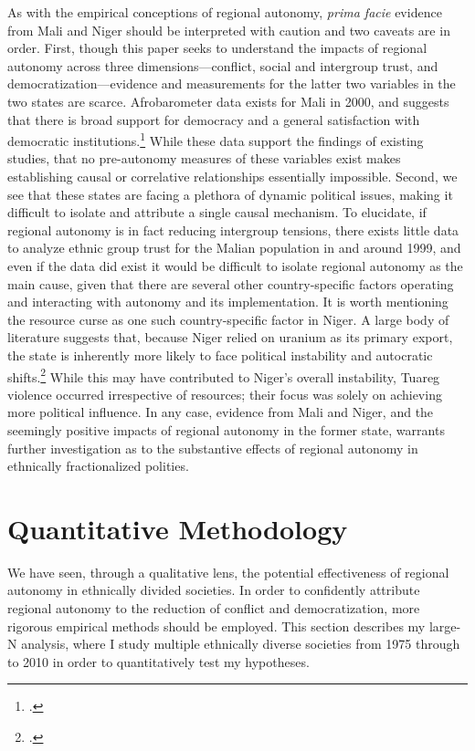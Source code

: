 \documentclass[12pt]{article}
\begin{document}
As with the empirical conceptions of regional autonomy, \textit{prima facie} evidence from Mali and Niger should be interpreted with caution and two caveats are in order. First, though this paper seeks to understand the impacts of regional autonomy across three dimensions---conflict, social and intergroup trust, and democratization---evidence and measurements for the latter two variables in the two states are scarce. Afrobarometer data exists for Mali in 2000, and suggests that there is broad support for democracy and a general satisfaction with democratic institutions.\footcite{afrobarometer_afrobarometer_1991} While these data support the findings of existing studies, that no pre-autonomy measures of these variables exist makes establishing causal or correlative relationships essentially impossible. Second, we see that these states are facing a plethora of dynamic political issues, making it difficult to isolate and attribute a single causal mechanism. To elucidate, if regional autonomy is in fact reducing intergroup tensions, there exists little data to analyze ethnic group trust for the Malian population in and around 1999, and even if the data did exist it would be difficult to isolate regional autonomy as the main cause, given that there are several other country-specific factors operating and interacting with autonomy and its implementation. It is worth mentioning the resource curse as one such country-specific factor in Niger. A large body of literature suggests that, because Niger relied on uranium as its primary export, the state is inherently more likely to face political instability and autocratic shifts.\footcite{mehlum_institutions_2006, sachs_curse_2001} While this may have contributed to Niger's overall instability, Tuareg violence occurred irrespective of resources; their focus was solely on achieving more political influence. In any case, evidence from Mali and Niger, and the seemingly positive impacts of regional autonomy in the former state, warrants further investigation as to the substantive effects of regional autonomy in ethnically fractionalized polities. 

\section{Quantitative Methodology}
We have seen, through a qualitative lens, the potential effectiveness of regional autonomy in ethnically divided societies. In order to confidently attribute regional autonomy to the reduction of conflict and democratization, more rigorous empirical methods should be employed. This section describes my large-N analysis, where I study multiple ethnically diverse societies from 1975 through to 2010 in order to quantitatively test my hypotheses. 
\end{document}
